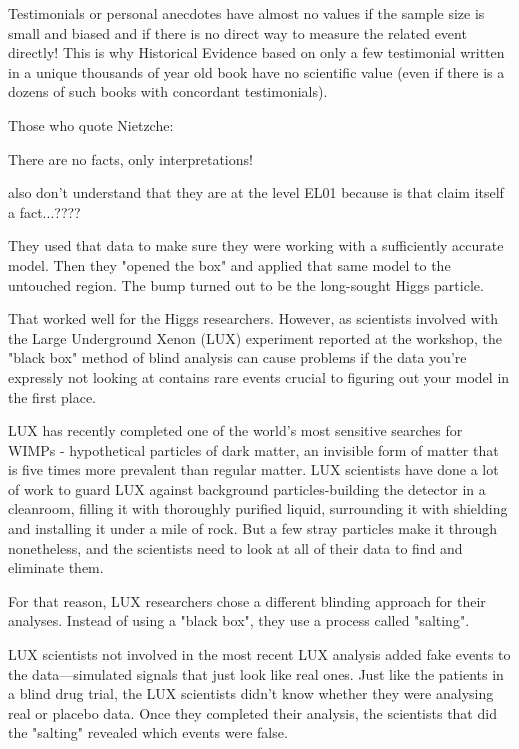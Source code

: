 	\begin{tcolorbox}[title=Remark,colframe=black,arc=10pt]
	Testimonials or personal anecdotes have almost no values if the sample size is small and biased and if there is no direct way to measure the related event directly! This is why Historical Evidence based on only a few testimonial written in a unique thousands of year old book have no scientific value (even if there is a dozens of such books with concordant testimonials).
	\end{tcolorbox}	
	
	Those who quote Nietzche:
	\begin{fquote}There are no facts, only interpretations!
 	\end{fquote}
 	also don't understand that they are at the level EL01 because is that claim itself a fact...????
	
	They used that data to make sure they were working with a sufficiently accurate model. Then they "opened the box" and applied that same model to the untouched region. The bump turned out to be the long-sought Higgs particle.

	That worked well for the Higgs researchers. However, as scientists involved with the Large Underground Xenon (LUX) experiment reported at the workshop, the "black box" method of blind analysis can cause problems if the data you're expressly not looking at contains rare events crucial to figuring out your model in the first place.
	
	LUX has recently completed one of the world's most sensitive searches for WIMPs - hypothetical particles of dark matter, an invisible form of matter that is five times more prevalent than regular matter. LUX scientists have done a lot of work to guard LUX against background particles-building the detector in a cleanroom, filling it with thoroughly purified liquid, surrounding it with shielding and installing it under a mile of rock. But a few stray particles make it through nonetheless, and the scientists need to look at all of their data to find and eliminate them.

	For that reason, LUX researchers chose a different blinding approach for their analyses. Instead of using a "black box", they use a process called "salting".

	LUX scientists not involved in the most recent LUX analysis added fake events to the data—simulated signals that just look like real ones. Just like the patients in a blind drug trial, the LUX scientists didn't know whether they were analysing real or placebo data. Once they completed their analysis, the scientists that did the "salting" revealed which events were false.

